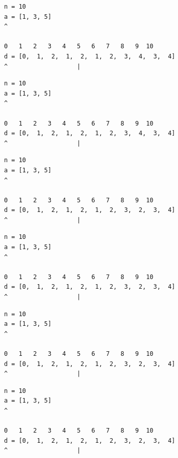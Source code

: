 \begin{frame}[fragile]
\begin{verbatim}
n = 10
a = [1, 3, 5]
^

0   1   2   3   4   5   6   7   8   9  10
d = [0,  1,  2,  1,  2,  1,  2,  3,  4,  3,  4]
^                   |
\end{verbatim}
\end{frame}
\addtocounter{framenumber}{-1}

\begin{frame}[fragile]
\begin{verbatim}
n = 10
a = [1, 3, 5]
^

0   1   2   3   4   5   6   7   8   9  10
d = [0,  1,  2,  1,  2,  1,  2,  3,  4,  3,  4]
^                   |
\end{verbatim}
\end{frame}
\addtocounter{framenumber}{-1}

\begin{frame}[fragile]
\begin{verbatim}
n = 10
a = [1, 3, 5]
^

0   1   2   3   4   5   6   7   8   9  10
d = [0,  1,  2,  1,  2,  1,  2,  3,  2,  3,  4]
^                   |
\end{verbatim}
\end{frame}
\addtocounter{framenumber}{-1}

\begin{frame}[fragile]
\begin{verbatim}
n = 10
a = [1, 3, 5]
^

0   1   2   3   4   5   6   7   8   9  10
d = [0,  1,  2,  1,  2,  1,  2,  3,  2,  3,  4]
^                   |
\end{verbatim}
\end{frame}
\addtocounter{framenumber}{-1}

\begin{frame}[fragile]
\begin{verbatim}
n = 10
a = [1, 3, 5]
^

0   1   2   3   4   5   6   7   8   9  10
d = [0,  1,  2,  1,  2,  1,  2,  3,  2,  3,  4]
^                   |
\end{verbatim}
\end{frame}
\addtocounter{framenumber}{-1}

\begin{frame}[fragile]
\begin{verbatim}
n = 10
a = [1, 3, 5]
^

0   1   2   3   4   5   6   7   8   9  10
d = [0,  1,  2,  1,  2,  1,  2,  3,  2,  3,  4]
^                   |
\end{verbatim}
\end{frame}
\addtocounter{framenumber}{-1}

